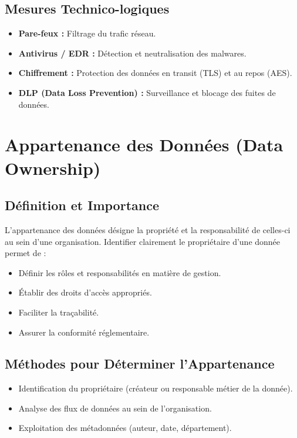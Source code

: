 \subsection{Mesures Technico-logiques}
\begin{itemize}
    \item \textbf{Pare-feux :} Filtrage du trafic réseau.
    \item \textbf{Antivirus / EDR :} Détection et neutralisation des malwares.
    \item \textbf{Chiffrement :} Protection des données en transit (TLS) et au repos (AES).
    \item \textbf{DLP (Data Loss Prevention) :} Surveillance et blocage des fuites de données.
\end{itemize}

\section{Appartenance des Données (Data Ownership)}

\subsection{Définition et Importance}
L'appartenance des données désigne la propriété et la responsabilité de celles-ci au sein d'une organisation. Identifier clairement le propriétaire d'une donnée permet de :
\begin{itemize}
    \item Définir les rôles et responsabilités en matière de gestion.
    \item Établir des droits d'accès appropriés.
    \item Faciliter la traçabilité.
    \item Assurer la conformité réglementaire.
\end{itemize}

\subsection{Méthodes pour Déterminer l'Appartenance}
\begin{itemize}
    \item Identification du propriétaire (créateur ou responsable métier de la donnée).
    \item Analyse des flux de données au sein de l'organisation.
    \item Exploitation des métadonnées (auteur, date, département).
\end{itemize}

